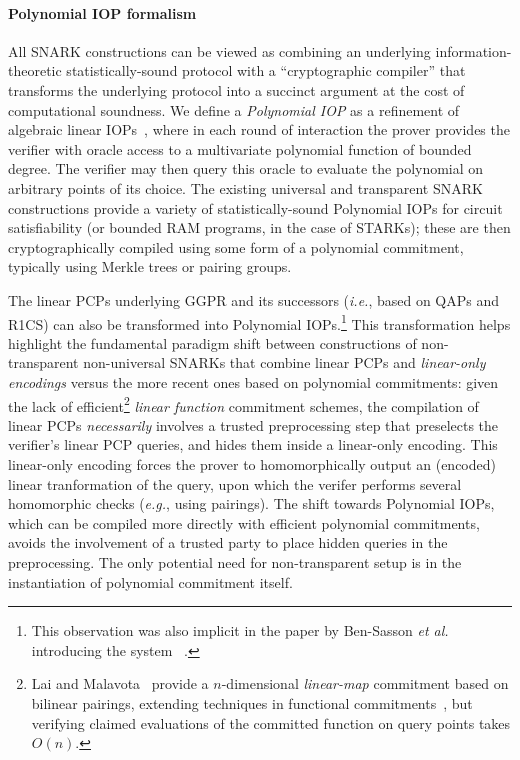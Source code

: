 \paragraph{Polynomial IOP formalism} %
All SNARK constructions can be viewed as combining an underlying information-theoretic statistically-sound protocol with a ``cryptographic compiler'' that transforms the underlying protocol into a succinct argument at the cost of computational soundness. 
We define a \emph{Polynomial IOP} as a refinement of algebraic linear IOPs~\cite{CC:IKO07,TCC:BCIOP13,C:BBCGI19}, where in each round of interaction the prover provides the verifier with oracle access to a multivariate polynomial function of bounded degree. The verifier may then query this oracle to evaluate the polynomial on arbitrary points of its choice. The existing universal and transparent SNARK constructions provide a variety of statistically-sound Polynomial IOPs for circuit satisfiability (or bounded RAM programs, in the case of STARKs); these are then cryptographically compiled using some form of a polynomial commitment, typically using Merkle trees or pairing groups.

The linear PCPs underlying GGPR and its successors (\emph{i.e.}, based on QAPs and R1CS) can also be transformed into Polynomial IOPs.\footnote{This observation was also implicit in the paper by Ben-Sasson \emph{et al.} introducing the system ~\cite{EC:BCRSVW19}.} This transformation helps highlight the fundamental paradigm shift between constructions of non-transparent non-universal SNARKs that combine linear PCPs and \emph{linear-only encodings} versus the more recent ones based on polynomial commitments: given the lack of efficient\footnote{Lai and Malavota~\cite{C:LaiMal19} provide a $n$-dimensional \emph{linear-map} commitment based on bilinear pairings, extending techniques in functional commitments~\cite{ICALP:LibRamYun16}, but verifying claimed evaluations of the committed function on query points takes $O(n)$.} \emph{linear function} commitment schemes, the compilation of linear PCPs \emph{necessarily} involves a trusted preprocessing step that preselects the verifier's linear PCP queries, and hides them inside a linear-only encoding. This linear-only encoding forces the prover to homomorphically output an (encoded) linear tranformation of the query, upon which the verifer performs several homomorphic checks (\emph{e.g.}, using pairings).
The shift towards Polynomial IOPs, which can be compiled more directly with efficient polynomial commitments, avoids the involvement of a trusted party to place hidden queries in the preprocessing. The only potential need for non-transparent setup is in the instantiation of polynomial commitment itself.

